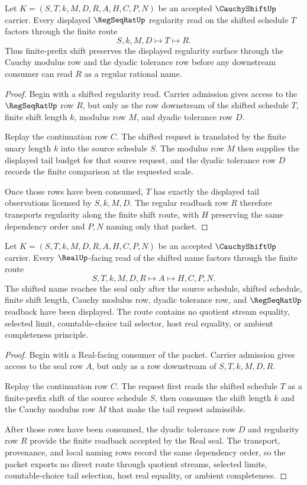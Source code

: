 \begin{theorem}
\label{thm:cauchy-shift-regularity-transport}
Let $K=(S,T,k,M,D,R,A,H,C,P,N)$ be an accepted $\CauchyShiftUp$ carrier. Every displayed $\RegSeqRatUp$ regularity read on the shifted schedule $T$ factors through the finite route
$$
S,k,M,D \longmapsto T \longmapsto R .
$$
Thus finite-prefix shift preserves the displayed regularity surface through the Cauchy modulus row and the dyadic tolerance row before any downstream consumer can read $R$ as a regular rational name.
\end{theorem}
\begin{proof}
Begin with a shifted regularity read. Carrier admission gives access to the $\RegSeqRatUp$ row $R$, but only as the row downstream of the shifted schedule $T$, finite shift length $k$, modulus row $M$, and dyadic tolerance row $D$.

Replay the continuation row $C$. The shifted request is translated by the finite unary length $k$ into the source schedule $S$. The modulus row $M$ then supplies the displayed tail budget for that source request, and the dyadic tolerance row $D$ records the finite comparison at the requested scale.

Once those rows have been consumed, $T$ has exactly the displayed tail observations licensed by $S,k,M,D$. The regular readback row $R$ therefore transports regularity along the finite shift route, with $H$ preserving the same dependency order and $P,N$ naming only that packet.
\end{proof}

\begin{theorem}
\label{thm:cauchy-shift-real-seal-boundary}
Let $K=(S,T,k,M,D,R,A,H,C,P,N)$ be an accepted $\CauchyShiftUp$ carrier. Every $\RealUp$-facing read of the shifted name factors through the finite route
$$
S,T,k,M,D,R \longmapsto A \longmapsto H,C,P,N .
$$
The shifted name reaches the seal only after the source schedule, shifted schedule, finite shift length, Cauchy modulus row, dyadic tolerance row, and $\RegSeqRatUp$ readback have been displayed. The route contains no quotient stream equality, selected limit, countable-choice tail selector, host real equality, or ambient completeness principle.
\end{theorem}
\begin{proof}
Begin with a Real-facing consumer of the packet. Carrier admission gives access to the seal row $A$, but only as a row downstream of $S,T,k,M,D,R$.

Replay the continuation row $C$. The request first reads the shifted schedule $T$ as a finite-prefix shift of the source schedule $S$, then consumes the shift length $k$ and the Cauchy modulus row $M$ that make the tail request admissible.

After those rows have been consumed, the dyadic tolerance row $D$ and regularity row $R$ provide the finite readback accepted by the Real seal. The transport, provenance, and local naming rows record the same dependency order, so the packet exports no direct route through quotient streams, selected limits, countable-choice tail selection, host real equality, or ambient completeness.
\end{proof}

